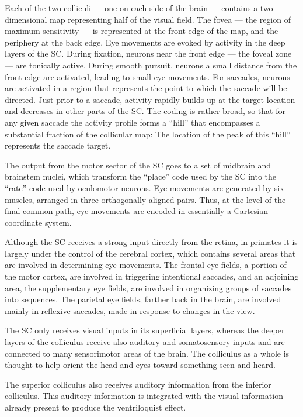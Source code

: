 Each of the two colliculi --- one on each side of the brain --- contains a two-dimensional map representing half of the visual field. The fovea --- the region of maximum sensitivity --- is represented at the front edge of the map, and the periphery at the back edge. Eye movements are evoked by activity in the deep layers of the SC. During fixation, neurons near the front edge --- the foveal zone --- are tonically active. During smooth pursuit, neurons a small distance from the front edge are activated, leading to small eye movements. For saccades, neurons are activated in a region that represents the point to which the saccade will be directed. Just prior to a saccade, activity rapidly builds up at the target location and decreases in other parts of the SC. The coding is rather broad, so that for any given saccade the activity profile forms a ``hill'' that encompasses a substantial fraction of the collicular map: The location of the peak of this ``hill'' represents the saccade target.

The output from the motor sector of the SC goes to a set of midbrain and brainstem nuclei, which transform the ``place'' code used by the SC into the ``rate'' code used by oculomotor neurons. Eye movements are generated by six muscles, arranged in three orthogonally-aligned pairs. Thus, at the level of the final common path, eye movements are encoded in essentially a Cartesian coordinate system.

Although the SC receives a strong input directly from the retina, in primates it is largely under the control of the cerebral cortex, which contains several areas that are involved in determining eye movements. The frontal eye fields, a portion of the motor cortex, are involved in triggering intentional saccades, and an adjoining area, the supplementary eye fields, are involved in organizing groups of saccades into sequences. The parietal eye fields, farther back in the brain, are involved mainly in reflexive saccades, made in response to changes in the view.

The SC only receives visual inputs in its superficial layers, whereas the deeper layers of the colliculus receive also auditory and somatosensory inputs and are connected to many sensorimotor areas of the brain. The colliculus as a whole is thought to help orient the head and eyes toward something seen and heard.

The superior colliculus also receives auditory information from the inferior colliculus. This auditory information is integrated with the visual information already present to produce the ventriloquist effect.

